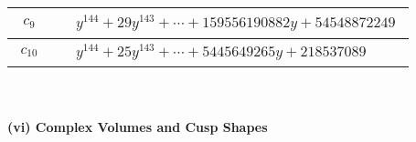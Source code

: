\documentclass[1p]{elsarticle_modified}
\theoremstyle{definition}
\begin{document}
\begin{tabular}{m{50pt}|m{274pt}}
\hline $$\begin{aligned}c_{9}\end{aligned}$$&$\begin{aligned}
&y^{144}+29 y^{143}+\cdots+159556190882 y+54548872249
\end{aligned}$\\
\hline $$\begin{aligned}c_{10}\end{aligned}$$&$\begin{aligned}
&y^{144}+25 y^{143}+\cdots+5445649265 y+218537089
\end{aligned}$\\
\hline
\end{tabular}\\~\\
\newpage\flushleft \textbf{(vi) Complex Volumes and Cusp Shapes}
\end{document}
